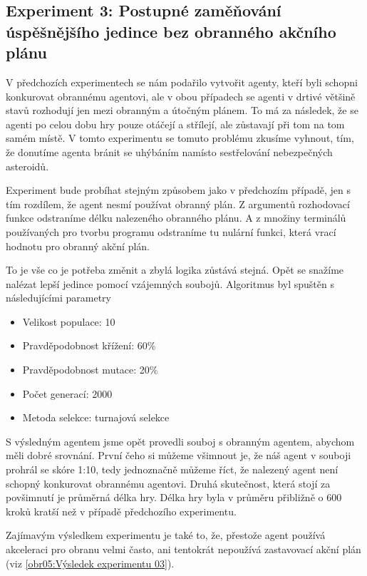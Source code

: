 \subsection{Experiment 3: Postupné zaměňování úspěšnějšího jedince bez obranného akčního plánu}

V předchozích experimentech se nám podařilo vytvořit agenty, kteří byli schopni konkurovat obrannému agentovi, ale v obou případech se agenti v drtivé většině stavů rozhodují jen mezi obranným a útočným plánem.
To má za následek, že se agenti po celou dobu hry pouze otáčejí a střílejí, ale zůstavají při tom na tom samém místě.
V tomto experimentu se tomuto problému zkusíme vyhnout, tím, že donutíme agenta bránit se uhýbáním namísto sestřelování nebezpečných asteroidů.

\par
Experiment bude probíhat stejným způsobem jako v předchozím případě, jen s tím rozdílem, že agent nesmí používat obranný plán.
Z argumentů rozhodovací funkce odstraníme délku nalezeného obranného plánu. A z množiny terminálů používaných pro tvorbu programu odstraníme tu nulární funkci, která vrací hodnotu pro obranný akční plán.

\par
To je vše co je potřeba změnit a zbylá logika zůstává stejná. Opět se snažíme nalézat lepší jedince pomocí vzájemných soubojů.
Algoritmus byl spuštěn s následujícími parametry
\begin{itemize}
    \item Velikost populace: 10
    \item Pravděpodobnost křížení: 60\%
    \item Pravděpodobnost mutace: 20\%
    \item Počet generací: 2000
    \item Metoda selekce: turnajová selekce
\end{itemize}

S výsledným agentem jsme opět provedli souboj s obranným agentem, abychom měli dobré srovnání. 
První čeho si můžeme všimnout je, že náš agent v souboji prohrál se skóre 1:10, tedy jednoznačně můžeme říct, že nalezený agent není schopný konkurovat obrannému agentovi.
Druhá skutečnost, která stojí za povšimnutí je průměrná délka hry. Délka hry byla v průměru přibližně o 600 kroků kratší než v případě předchozího experimentu.

\par
Zajímavým výsledkem experimentu je také to, že, přestože agent používá akceleraci pro obranu velmi často, ani tentokrát nepoužívá zastavovací akční plán (viz \ref{obr05:Výsledek experimentu 03}).

